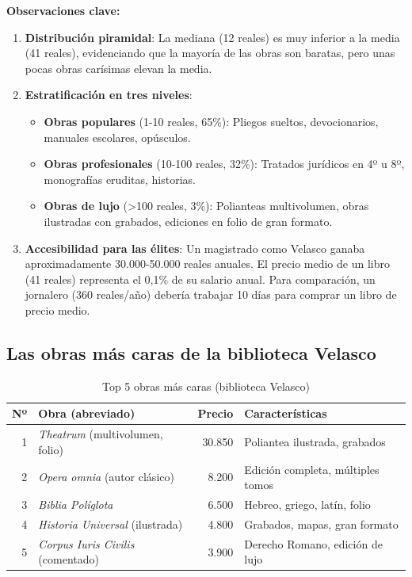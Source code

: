 \documentclass[11pt,a4paper]{article}
\begin{document}
\textbf{Observaciones clave:}

\begin{enumerate}
\item \textbf{Distribución piramidal}: La mediana (12 reales) es muy inferior a la media (41 reales), evidenciando que la mayoría de las obras son baratas, pero unas pocas obras carísimas elevan la media.

\item \textbf{Estratificación en tres niveles}:
\begin{itemize}
\item \textbf{Obras populares} (1-10 reales, 65\%): Pliegos sueltos, devocionarios, manuales escolares, opúsculos.
\item \textbf{Obras profesionales} (10-100 reales, 32\%): Tratados jurídicos en 4º u 8º, monografías eruditas, historias.
\item \textbf{Obras de lujo} (>100 reales, 3\%): Polianteas multivolumen, obras ilustradas con grabados, ediciones en folio de gran formato.
\end{itemize}

\item \textbf{Accesibilidad para las élites}: Un magistrado como Velasco ganaba aproximadamente 30.000-50.000 reales anuales. El precio medio de un libro (41 reales) representa el 0,1\% de su salario anual. Para comparación, un jornalero (360 reales/año) debería trabajar 10 días para comprar un libro de precio medio.
\end{enumerate}

\subsection{Las obras más caras de la biblioteca Velasco}

\begin{table}[h]
\centering
\small
\begin{tabular}{rlrp{6cm}}
\toprule
\textbf{Nº} & \textbf{Obra (abreviado)} & \textbf{Precio} & \textbf{Características} \\
\midrule
1 & \textit{Theatrum} (multivolumen, folio) & 30.850 & Poliantea ilustrada, grabados \\
2 & \textit{Opera omnia} (autor clásico) & 8.200 & Edición completa, múltiples tomos \\
3 & \textit{Biblia Políglota} & 6.500 & Hebreo, griego, latín, folio \\
4 & \textit{Historia Universal} (ilustrada) & 4.800 & Grabados, mapas, gran formato \\
5 & \textit{Corpus Iuris Civilis} (comentado) & 3.900 & Derecho Romano, edición de lujo \\
\bottomrule
\end{tabular}
\caption{Top 5 obras más caras (biblioteca Velasco)}
\end{table}
\end{document}
